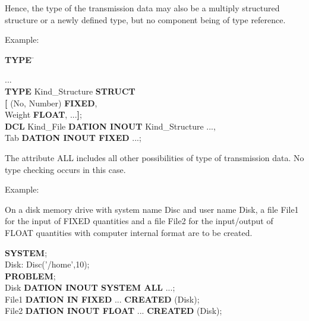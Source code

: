 

Hence, the type of the transmission data may also be a multiply
structured structure or a newly defined type, but no component being of
type reference.

Example:

\begin{tabbing}
{\bf TYPE} \= \kill

...        \> \\
{\bf TYPE} \> Kind\_Structure {\bf STRUCT} \\
    \> {\bf [} (No, Number) {\bf FIXED},\\
    \> \x Weight {\bf FLOAT}, ...{\bf ]};\\
{\bf DCL}  \> Kind\_File {\bf DATION INOUT} Kind\_Structure ...,\\
    \> Tab {\bf DATION INOUT FIXED} ...;
\end{tabbing}

The attribute ALL includes all other possibilities of type of
transmission data.
No type checking occurs in this case.

Example:

On a disk memory drive with system name
Disc
  and user name Disk, a file
File1 for the input of FIXED quantities and a file File2 for the
input/output of FLOAT quantities with computer internal format are to be
created.

{\bf SYSTEM};\\
\x Disk: Disc('/home',10);\\
{\bf PROBLEM};\\
 Disk {\bf DATION INOUT SYSTEM ALL} ...;\\
 File1 {\bf DATION IN FIXED} ... {\bf CREATED} (Disk);\\
 File2 {\bf DATION INOUT FLOAT} ... {\bf CREATED} (Disk);

